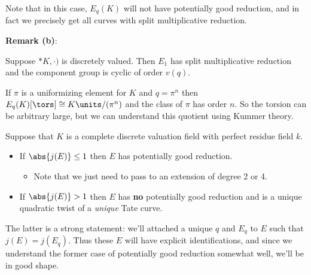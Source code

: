 Note that in this case, \(E_q(K)\) will not have potentially good
reduction, and in fact we precisely get all curves with split
multiplicative reduction.

\textbf{Remark (b)}:

Suppose \(*K, \cdot)\) is discretely valued. Then \(E_1\) has split
multiplicative reduction and the component group is cyclic of order
\(v(q)\).

\begin{description}
\tightlist
\item[Example]
If \(\pi\) is a uniformizing element for \(K\) and \(q = \pi^n\) then
\(E_q(K)[\tors] \cong K\units / (\pi^n)\) and the class of \(\pi\) has
order \(n\). So the torsion can be arbitrary large, but we can
understand this quotient using Kummer theory.
\end{description}

Suppose that \(K\) is a complete discrete valuation field with perfect
residue field \(k\).

\begin{itemize}
\tightlist
\item
  If \(\abs{j(E)} \leq 1\) then \(E\) has potentially good reduction.

  \begin{itemize}
  \tightlist
  \item
    Note that we just need to pass to an extension of degree 2 or 4.
  \end{itemize}
\item
  If \(\abs{j(E)} > 1\) then \(E\) has \textbf{no} potentially good
  reduction and is a unique quadratic twist of a \emph{unique} Tate
  curve.
\end{itemize}

The latter is a strong statement: we'll attached a unique \(q\) and
\(E_q\) to \(E\) such that \(j(E) = j(E_q)\). Thus these \(E\) will have
explicit identifications, and since we understand the former case of
potentially good reduction somewhat well, we'll be in good shape.

